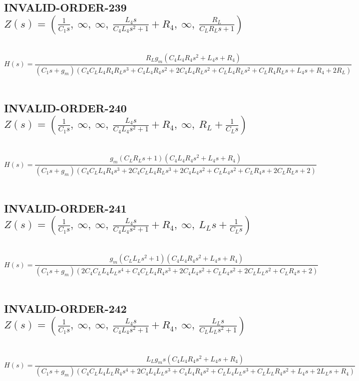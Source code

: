 \documentclass{article}
\begin{document}
\subsection{INVALID-ORDER-239 $Z(s) = \left( \frac{1}{C_{1} s}, \  \infty, \  \infty, \  \frac{L_{4} s}{C_{4} L_{4} s^{2} + 1} + R_{4}, \  \infty, \  \frac{R_{L}}{C_{L} R_{L} s + 1}\right)$ } \ 
\textbf{\[H(s) = \frac{R_{L} g_{m} \left(C_{4} L_{4} R_{4} s^{2} + L_{4} s + R_{4}\right)}{\left(C_{1} s + g_{m}\right) \left(C_{4} C_{L} L_{4} R_{4} R_{L} s^{3} + C_{4} L_{4} R_{4} s^{2} + 2 C_{4} L_{4} R_{L} s^{2} + C_{L} L_{4} R_{L} s^{2} + C_{L} R_{4} R_{L} s + L_{4} s + R_{4} + 2 R_{L}\right)}\] } \ 
\subsection{INVALID-ORDER-240 $Z(s) = \left( \frac{1}{C_{1} s}, \  \infty, \  \infty, \  \frac{L_{4} s}{C_{4} L_{4} s^{2} + 1} + R_{4}, \  \infty, \  R_{L} + \frac{1}{C_{L} s}\right)$ } \ 
\textbf{\[H(s) = \frac{g_{m} \left(C_{L} R_{L} s + 1\right) \left(C_{4} L_{4} R_{4} s^{2} + L_{4} s + R_{4}\right)}{\left(C_{1} s + g_{m}\right) \left(C_{4} C_{L} L_{4} R_{4} s^{3} + 2 C_{4} C_{L} L_{4} R_{L} s^{3} + 2 C_{4} L_{4} s^{2} + C_{L} L_{4} s^{2} + C_{L} R_{4} s + 2 C_{L} R_{L} s + 2\right)}\] } \ 
\subsection{INVALID-ORDER-241 $Z(s) = \left( \frac{1}{C_{1} s}, \  \infty, \  \infty, \  \frac{L_{4} s}{C_{4} L_{4} s^{2} + 1} + R_{4}, \  \infty, \  L_{L} s + \frac{1}{C_{L} s}\right)$ } \ 
\textbf{\[H(s) = \frac{g_{m} \left(C_{L} L_{L} s^{2} + 1\right) \left(C_{4} L_{4} R_{4} s^{2} + L_{4} s + R_{4}\right)}{\left(C_{1} s + g_{m}\right) \left(2 C_{4} C_{L} L_{4} L_{L} s^{4} + C_{4} C_{L} L_{4} R_{4} s^{3} + 2 C_{4} L_{4} s^{2} + C_{L} L_{4} s^{2} + 2 C_{L} L_{L} s^{2} + C_{L} R_{4} s + 2\right)}\] } \ 
\subsection{INVALID-ORDER-242 $Z(s) = \left( \frac{1}{C_{1} s}, \  \infty, \  \infty, \  \frac{L_{4} s}{C_{4} L_{4} s^{2} + 1} + R_{4}, \  \infty, \  \frac{L_{L} s}{C_{L} L_{L} s^{2} + 1}\right)$ } \ 
\textbf{\[H(s) = \frac{L_{L} g_{m} s \left(C_{4} L_{4} R_{4} s^{2} + L_{4} s + R_{4}\right)}{\left(C_{1} s + g_{m}\right) \left(C_{4} C_{L} L_{4} L_{L} R_{4} s^{4} + 2 C_{4} L_{4} L_{L} s^{3} + C_{4} L_{4} R_{4} s^{2} + C_{L} L_{4} L_{L} s^{3} + C_{L} L_{L} R_{4} s^{2} + L_{4} s + 2 L_{L} s + R_{4}\right)}\] } \ 
\end{document}
